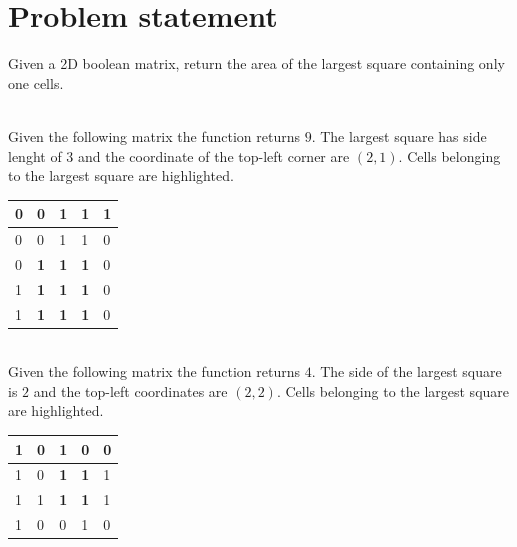 \section{Problem statement}
\begin{exercise}
Given a 2D boolean matrix, return the area of the largest square containing only one cells.
	\begin{example}
		\hfill \\
		Given the following matrix the function returns $9$. The largest square has side lenght of
		$3$ and the coordinate of the top-left corner are $(2,1)$. Cells belonging to the largest
		square are highlighted.

		\begin{tabular}{|l|l|l|l|l|}
		\hline
		0 & 0                                  & 1                                  & 1 & 1 \\
		\hline
		0 & 0                                  & 1                                  & 1 & 0 \\
		\hline
		0 & \cellcolor[HTML]{32CB00}\textbf{1} & \cellcolor[HTML]{32CB00}\textbf{1} &
		\cellcolor[HTML]{32CB00}\textbf{1} & 0 \\ \hline
		1 & \cellcolor[HTML]{32CB00}\textbf{1} & \cellcolor[HTML]{32CB00}\textbf{1} &
		\cellcolor[HTML]{32CB00}\textbf{1} & 0 \\ \hline
		1 & \cellcolor[HTML]{32CB00}\textbf{1} & \cellcolor[HTML]{32CB00}\textbf{1} &
		\cellcolor[HTML]{32CB00}\textbf{1} & 0 \\ \hline
		\end{tabular}
		
	\end{example}

	\begin{example}
		\hfill \\
		Given the following matrix the function returns $4$. The side of the largest square is $2$
		and the top-left coordinates are $(2,2)$. Cells belonging to the largest square are
		highlighted.
		\begin{tabular}{|l|l|l|l|l|}
		\hline
		1 & 0 & 1                                  & 0                                  & 0 \\
		\hline
		1 & 0 & \cellcolor[HTML]{32CB00}\textbf{1} & \cellcolor[HTML]{32CB00}\textbf{1} & 1 \\
		\hline
		1 & 1 & \cellcolor[HTML]{32CB00}\textbf{1} & \cellcolor[HTML]{32CB00}\textbf{1} & 1 \\
		\hline
		1 & 0 & 0                                  & 1                                  & 0 \\
		\hline
\end{tabular}

	\end{example}

\end{exercise}


